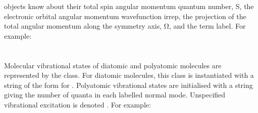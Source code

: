\documentclass[letterpaper,10pt,english]{sphinxmanual}
\begin{document}
 objects know about their total spin angular momentum quantum number, S, the electronic orbital angular momentum wavefunction irrep, the projection of the total angular momentum along the symmetry axis, Ω, and the term label. For example:

\begin{sphinxVerbatim}[commandchars=\\\{\}]
 \PYG{p}{[}\PYG{p}{]}   
 \PYG{p}{[}\PYG{p}{]}    
\PYG{p}{[}\PYG{p}{]}    
\end{sphinxVerbatim}


\section{}
\label{\detokenize{states:vibrationalstate}}
Molecular vibrational states of diatomic and polyatomic molecules are represented by the  class. For diatomic molecules, this class is instantiated with a string of the form  for . Polyatomic vibrational states are initialised with a string giving the number of quanta in each labelled normal mode. Unspecified vibrational excitation is denoted . For example:
\end{document}
